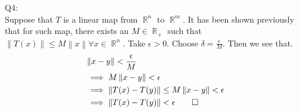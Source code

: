 \documentclass[letterpaper]{article}
\DeclareMathOperator{\R}{\mathbb{R}}
\newcommand{\norm}[1]{\left\lVert#1\right\rVert}
\begin{document}
Q4: \\
Suppose that $T$ is a linear map from $\R^n $ to $\R^m$. It has been shown previously that for such map, there exists an $M \in \R_+$ such that $\norm{T(x)} \leq M\norm{x} \forall x \in \R^n$. Take $\epsilon >0$. Choose $\delta = \frac{\epsilon}{M}$. Then we see that. 
\begin{align*}
    & \norm{x-y} < \frac{\epsilon}{M}
    \\ & \implies M \norm{x-y} < \epsilon
    \\ & \implies \norm{T(x)-T(y)} \leq M \norm{x-y} < \epsilon
    \\ & \implies \norm{T(x)-T(y) } < \epsilon
    \qed
\end{align*}
\end{document}
